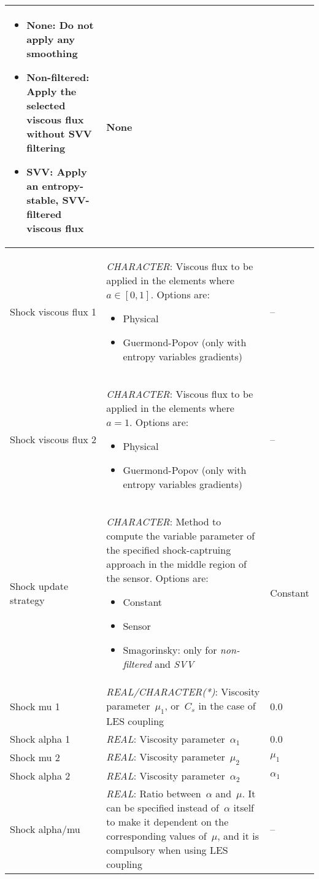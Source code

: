 \documentclass[a4paper,10pt]{report}
\begin{document}
\begin{longtable}{|l|p{10cm}|p{2.2cm}|}
    \begin{itemize}
        \item None: Do not apply any smoothing
        \item Non-filtered: Apply the selected viscous flux without SVV filtering
        \item SVV: Apply an entropy-stable, SVV-filtered viscous flux
    \end{itemize} & None \\ \hline
Shock viscous flux 1 & \textit{CHARACTER}: Viscous flux to be applied in the elements where~$a\in[0,1]$. Options are:
    \begin{itemize}
        \item Physical
        \item Guermond-Popov (only with entropy variables gradients)
    \end{itemize} & -- \\ \hline
Shock viscous flux 2 & \textit{CHARACTER}: Viscous flux to be applied in the elements where~$a=1$. Options are:
    \begin{itemize}
        \item Physical
        \item Guermond-Popov (only with entropy variables gradients)
    \end{itemize} & -- \\ \hline
Shock update strategy & \textit{CHARACTER}: Method to compute the variable parameter of the specified shock-captruing approach in the middle region of the sensor. Options are:
    \begin{itemize}
        \item Constant
        \item Sensor
        \item Smagorinsky: only for \textit{non-filtered} and \textit{SVV}
    \end{itemize} & Constant \\ \hline
Shock mu 1 & \textit{REAL/CHARACTER(*)}: Viscosity parameter~$\mu_1$, or~$C_s$ in the case of LES coupling & 0.0 \\ \hline
Shock alpha 1 & \textit{REAL}: Viscosity parameter~$\alpha_1$ & 0.0 \\ \hline
Shock mu 2 & \textit{REAL}: Viscosity parameter~$\mu_2$ & $\mu_1$ \\ \hline
Shock alpha 2 & \textit{REAL}: Viscosity parameter~$\alpha_2$ & $\alpha_1$ \\ \hline
Shock alpha/mu & \textit{REAL}: Ratio between~$\alpha$ and~$\mu$. It can be specified instead of~$\alpha$ itself to make it dependent on the corresponding values of~$\mu$, and it is compulsory when using LES coupling & -- \\ \hline

\end{longtable}
\end{document}
